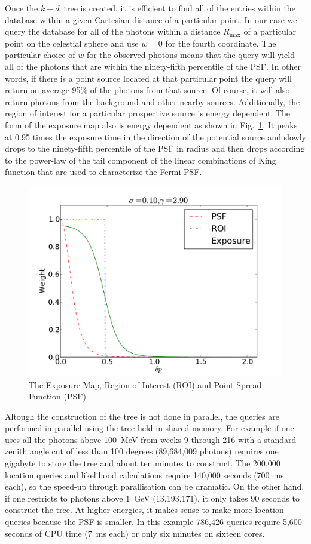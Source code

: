 \documentclass[useAMS,usenatbib]{mn2e}
\begin{document}
Once the $k-d$~tree is created, it is efficient to find all of the
entries within the database within a given Cartesian distance of a
particular point.  In our case we query the database for all of the
photons within a distance $R_\mathrm{max}$ of a particular point on
the celestial sphere and use $w=0$ for the fourth coordinate.  The
particular choice of $w$ for the observed photons means that the query
will yield all of the photons that are within the ninety-fifth
percentile of the PSF.  In other words, if there is a point source
located at that particular point the query will return on average 95\%
of the photons from that source.  Of course, it will also return
photons from the background and other nearby sources.  Additionally,
the region of interest for a particular prospective source is energy
dependent.  The form of the exposure map also is energy dependent as
shown in Fig.~\ref{fig:expmap}.  It peaks at 0.95 times the exposure
time in the direction of the potential source and slowly drops to the
ninety-fifth percentile of the PSF in radius and then drops according
to the power-law of the tail component of the linear combinations of
King function that are used to characterize the Fermi PSF. 
\begin{figure}
\includegraphics[width=\columnwidth]{expmap}
\caption{The Exposure Map, Region of Interest (ROI)
  and Point-Spread Function (PSF)}
\label{fig:expmap}
\end{figure}

Altough the construction of the tree is not done in parallel, the
queries are performed in parallel using the tree held in shared
memory.  For example if one uses all the photons above 100~MeV from
weeks 9 through 216 with a standard zenith angle cut of less than 100
degrees (89,684,009 photons) requires one gigabyte to store the tree
and about ten minutes to construct. The 200,000 location queries and
likelihood calculations require 140,000 seconds (700~ms each), so the
speed-up through parallisation can be dramatic.  On the other hand, if
one restricts to photons above 1~GeV (13,193,171), it only takes 90
seconds to construct the tree.  At higher energies, it makes sense to
make more location queries because the PSF is smaller.  In this
example 786,426 queries require 5,600 seconds of CPU time (7~ms each)
or only six minutes on sixteen cores.
\end{document}
